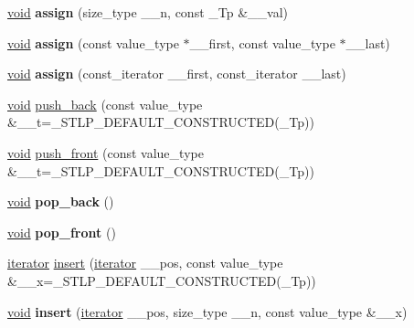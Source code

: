 \begin{DoxyCompactItemize}
\item 
\mbox{\label{classdeque_aac993d1af3e42bcc0ffc3644e545b49d}} 
\hyperlink{interfacevoid}{void} {\bfseries assign} (size\+\_\+type \+\_\+\+\_\+n, const \+\_\+\+Tp \&\+\_\+\+\_\+val)
\item 
\mbox{\label{classdeque_abd118d8d021843fb731812c177a9d387}} 
\hyperlink{interfacevoid}{void} {\bfseries assign} (const value\+\_\+type $\ast$\+\_\+\+\_\+first, const value\+\_\+type $\ast$\+\_\+\+\_\+last)
\item 
\mbox{\label{classdeque_ad31750de5d83743071b0ba68881f6e26}} 
\hyperlink{interfacevoid}{void} {\bfseries assign} (const\+\_\+iterator \+\_\+\+\_\+first, const\+\_\+iterator \+\_\+\+\_\+last)
\item 
\hyperlink{interfacevoid}{void} \hyperlink{classdeque_a365cc9bed82b9ce3baec754a2c5534c7}{push\+\_\+back} (const value\+\_\+type \&\+\_\+\+\_\+t=\+\_\+\+S\+T\+L\+P\+\_\+\+D\+E\+F\+A\+U\+L\+T\+\_\+\+C\+O\+N\+S\+T\+R\+U\+C\+T\+ED(\+\_\+\+Tp))
\item 
\hyperlink{interfacevoid}{void} \hyperlink{classdeque_a5b7c21146c392ff2959d3ebaf498cf48}{push\+\_\+front} (const value\+\_\+type \&\+\_\+\+\_\+t=\+\_\+\+S\+T\+L\+P\+\_\+\+D\+E\+F\+A\+U\+L\+T\+\_\+\+C\+O\+N\+S\+T\+R\+U\+C\+T\+ED(\+\_\+\+Tp))
\item 
\mbox{\label{classdeque_ae7ae8102a53e4f72f853de9e79aa76df}} 
\hyperlink{interfacevoid}{void} {\bfseries pop\+\_\+back} ()
\item 
\mbox{\label{classdeque_a2d248dbded70706ad477b8548a9ffa7f}} 
\hyperlink{interfacevoid}{void} {\bfseries pop\+\_\+front} ()
\item 
\hyperlink{structiterator}{iterator} \hyperlink{classdeque_a11db751b5a2c95c19f852703b6724591}{insert} (\hyperlink{structiterator}{iterator} \+\_\+\+\_\+pos, const value\+\_\+type \&\+\_\+\+\_\+x=\+\_\+\+S\+T\+L\+P\+\_\+\+D\+E\+F\+A\+U\+L\+T\+\_\+\+C\+O\+N\+S\+T\+R\+U\+C\+T\+ED(\+\_\+\+Tp))
\item 
\mbox{\label{classdeque_ac4bfac374cf3c088591ca63ad9855ed6}} 
\hyperlink{interfacevoid}{void} {\bfseries insert} (\hyperlink{structiterator}{iterator} \+\_\+\+\_\+pos, size\+\_\+type \+\_\+\+\_\+n, const value\+\_\+type \&\+\_\+\+\_\+x)
\item 

\end{DoxyCompactItemize}
